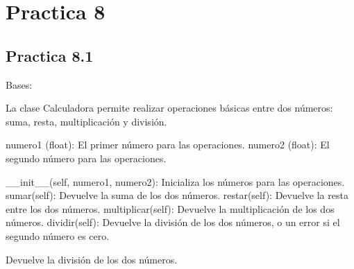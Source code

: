 \documentclass[letterpaper,10pt,spanish]{sphinxmanual}
\begin{document}
\sphinxstepscope
\chapter{Practica 8}
\label{\detokenize{pr8:practica-8}}\label{\detokenize{pr8::doc}}
\section{Practica 8.1}
\label{\detokenize{pr8:module-pr8.1}}\label{\detokenize{pr8:practica-8-1}}

\begin{fulllineitems}
\label{\detokenize{pr8:pr8.1.Calculadora}}
\pysigstartsignatures
{}
\pysigstopsignatures
\sphinxAtStartPar
Bases: 

\sphinxAtStartPar
La clase Calculadora permite realizar operaciones básicas entre dos números: suma, resta, multiplicación y división.
\begin{description}
\sphinxAtStartPar
numero1 (float): El primer número para las operaciones.
numero2 (float): El segundo número para las operaciones.

\sphinxAtStartPar
\_\_init\_\_(self, numero1, numero2): Inicializa los números para las operaciones.
sumar(self): Devuelve la suma de los dos números.
restar(self): Devuelve la resta entre los dos números.
multiplicar(self): Devuelve la multiplicación de los dos números.
dividir(self): Devuelve la división de los dos números, o un error si el segundo número es cero.

\end{description}

\begin{fulllineitems}
\label{\detokenize{pr8:pr8.1.Calculadora.dividir}}
\pysigstartsignatures
{}
\pysigstopsignatures
\sphinxAtStartPar
Devuelve la división de los dos números.


\end{fulllineitems}
\end{fulllineitems}
\end{document}
